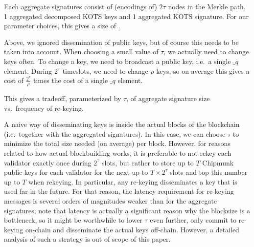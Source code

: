 
Each aggregate signatures consist of (encodings of) $2\tau$ nodes in the Merkle path, 1 aggregated decomposed KOTS keys and 1 aggregated KOTS signature.
For our parameter choices, this gives a size of .

\bigskip
Above, we ignored dissemination of public keys, but of course this needs to be taken into account.
When choosing a small value of $\tau$, we actually need to change keys often.
To change a key, we need to broadcast a public key, i.e.\ a single $\ring_q$ element.
During $2^\tau$ timeslots, we need to change $\rho$ keys, so on average this gives a cost of $\frac{2^\tau}{\rho}$ times the cost of a single $\ring_q$ element.

This gives a tradeoff, parameterized by $\tau$, of aggregate signature size vs.\ frequency of re-keying.

A naive way of disseminating keys is inside the actual blocks of the blockchain (i.e.\ together with the aggregated signatures).
In this case, we can choose $\tau$ to minimize the total size needed (on average) per block.
However, for reasons related to how actual blockbuilding works, it is preferable to not rekey each validator exactly once during $2^\tau$ slots, but rather to store up to $T$ Chipmunk public keys for each validator for the next up to $T\times 2^\tau$ slots and top this number up to $T$ when rekeying.
In particular, any re-keying disseminates a key that is used far in the future.
For that reason, the latency requirement for re-keying messages is several orders of magnitudes weaker than for the aggregate signatures;
note that latency is actually a significant reason why the blocksize is a bottleneck, so it might be worthwhile to lower $\tau$ even further, only commit to re-keying on-chain and disseminate the actual keys off-chain.
However, a detailed analysis of such a strategy is out of scope of this paper.
